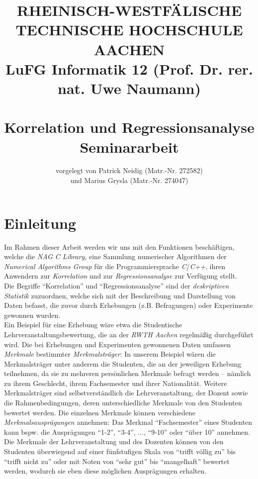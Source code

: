 \documentclass{article}
\title{
{\bf \scriptsize RHEINISCH-WESTF\"ALISCHE TECHNISCHE HOCHSCHULE AACHEN \\
LuFG Informatik 12 (Prof. Dr. rer. nat. Uwe Naumann)}
\vspace{.5cm} \\
\epsfig{file=figures/STCE_Logo_WWW.eps,width=.7\textwidth}
\vspace{1cm} \\
{\bf \Large Korrelation und Regressionsanalyse} \\
{\large Seminararbeit} 
}
\author{vorgelegt von Patrick Neidig (Matr.-Nr. 272582)\\
	und Marius Grysla (Matr.-Nr. 274047)}
\begin{document}


\pagestyle{headings}

\maketitle

\newpage
\tableofcontents

\newpage


\section{Einleitung}
Im Rahmen dieser Arbeit werden wir uns mit den Funktionen beschäftigen, welche die {\it NAG C Library}, eine Sammlung numerischer Algorithmen der {\it Numerical Algorithms Group} für die Programmiersprache {\it C}/{\it C++}, ihren Anwendern zur {\it Korrelation} und zur {\it Regressionsanalyse} zur Verfügung stellt.\\
Die Begriffe "`Korrelation"' und "`Regressionsanalyse"' sind der {\it deskriptiven Statistik} zuzuordnen, welche sich mit der Beschreibung und Darstellung von Daten befasst, die zuvor durch Erhebungen (z.B. Befragungen) oder Experimente gewonnen wurden.\\
Ein Beispiel für eine Erhebung wäre etwa die Studentische Lehrveranstaltungsbewertung, die an der {\it RWTH Aachen} regelmäßig durchgeführt wird. Die bei Erhebungen und Experimenten gewonnenen Daten umfassen {\it Merkmale} bestimmter {\it Merkmalsträger}: In unserem Beispiel wären die Merkmalsträger unter anderem die Studenten, die an der jeweiligen Erhebung teilnehmen, da sie zu mehreren persönlichen Merkmale befragt werden -- nämlich zu ihrem Geschlecht, ihrem Fachsemester und ihrer Nationalität. Weitere Merkmalsträger sind selbstverständlich die Lehrveranstaltung, der Dozent sowie die Rahmenbedingungen, deren unterschiedliche Merkmale von den Studenten bewertet werden. Die einzelnen Merkmale können verschiedene {\it Merkmalsausprägungen} annehmen: Das Merkmal "`Fachsemester"' eines Studenten kann bspw. die Ausprägungen "`1-2"', "`3-4"', ..., "`9-10"' oder "`über 10"' annehmen. Die Merkmale der Lehrveranstaltung und des Dozenten können von den Studenten überwiegend auf einer fünfstufigen Skala von "`trifft völlig zu"' bis "`trifft nicht zu"' oder mit Noten von "`sehr gut"' bis "`mangelhaft"' bewertet werden, wodurch sie eben diese möglichen Ausprägungen erhalten.\\
\end{document}
